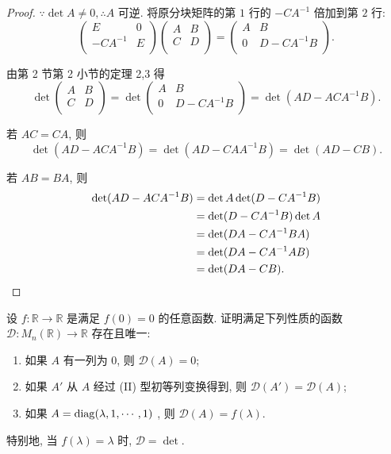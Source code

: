 \documentclass{ctexart}
\begin{document}
\begin{proof}
    $\because\det A\neq0,\therefore A$ 可逆. 将原分块矩阵的第 $1$ 行的 $-CA^{-1}$ 倍加到第 $2$ 行:
    \[\begin{pmatrix}
        E & 0 \\
        -CA^{-1} & E \\
    \end{pmatrix}\begin{pmatrix}
        A & B \\
        C & D \\
    \end{pmatrix}=\begin{pmatrix}
        A & B \\
        0 & D-CA^{-1}B \\
    \end{pmatrix}.\]

    由第 2 节第 2 小节的定理 2,3 得
    \[\det\begin{pmatrix}
        A & B \\
        C & D \\
    \end{pmatrix}=\det\begin{pmatrix}
        A & B \\
        0 & D-CA^{-1}B \\
    \end{pmatrix}=\det(AD-ACA^{-1}B).\]

    若 $AC=CA$, 则
    \[\det(AD-ACA^{-1}B)=\det(AD-CAA^{-1}B)=\det(AD-CB).\]

    若 $AB=BA$, 则
    \begin{align*}
        \det(AD-ACA^{-1}B) & =\det A\det(D-CA^{-1}B) \\
        & =\det(D-CA^{-1}B)\det A \\
        & =\det(DA-CA^{-1}BA) \\
        & =\det(DA-CA^{-1}AB) \\
        & =\det(DA-CB).\qedhere
    \end{align*}
\end{proof}
\begin{exercise}%
    设 $f:\mathbb{R}\to\mathbb{R}$ 是满足 $f(0)=0$ 的任意函数. 证明满足下列性质的函数 $\mathcal{D}:M_n(\mathbb{R})\to\mathbb{R}$ 存在且唯一:
    \begin{enumerate}
        \item 如果 $A$ 有一列为 $0$, 则 $\mathcal{D}(A)=0$;
        \item 如果 $A'$ 从 $A$ 经过 (II) 型初等列变换得到, 则 $\mathcal{D}(A')=\mathcal{D}(A)$;
        \item 如果 $A=\operatorname{diag} (\lambda,1,\cdots,1)$ , 则 $\mathcal{D}(A)=f(\lambda)$.
    \end{enumerate}

    特别地, 当 $f(\lambda)=\lambda$ 时, $\mathcal{D}=\det$.
\end{exercise}
\end{document}
